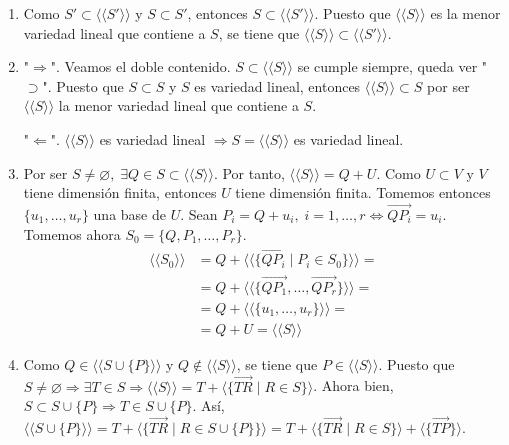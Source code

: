 \documentclass[12pt, a4paper, ones, notitlepage, openany,titlepage]{article}
\begin{document}
\begin{enumerate}[label=(\alph*)]
	\item Como $S' \subset \langle\langle S' \rangle\rangle$ y $S \subset S'$, entonces $S \subset \langle\langle S' \rangle\rangle$. Puesto que $\langle\langle S \rangle\rangle$ es la menor variedad lineal que contiene a $S$, se tiene que $\langle\langle S \rangle\rangle \subset \langle\langle S' \rangle\rangle$.
	\item "$\Longrightarrow$". Veamos el doble contenido. $S \subset \langle\langle S \rangle\rangle$ se cumple siempre, queda ver "$\supset$". Puesto que $S \subset S$ y $S$ es variedad lineal, entonces $\langle\langle S \rangle\rangle \subset S$ por ser $\langle\langle S \rangle\rangle$ la menor variedad lineal que contiene a $S$.
	
	"$\Longleftarrow$". $\langle\langle S \rangle\rangle$ es variedad lineal $\Longrightarrow S = \langle\langle S \rangle\rangle$ es variedad lineal.
	\item Por ser $S \neq \varnothing, \; \exists Q \in S \subset \langle\langle S \rangle\rangle$. Por tanto, $\langle\langle S \rangle\rangle = Q + U$. Como $U \subset V$ y $V$ tiene dimensión finita, entonces $U$ tiene dimensión finita. Tomemos entonces $\{u_1,\ldots,u_r\}$ una base de $U$. Sean $P_i = Q + u_i, \; i = 1,\ldots,r \Longleftrightarrow \overrightarrow{QP_i} = u_i$. Tomemos ahora $S_0 = \{Q, P_1, \ldots, P_r\}$.
	$$
	\begin{aligned}
		\langle\langle S_0 \rangle\rangle & = Q + \langle\langle \{\overrightarrow{QP_i} \mid P_i \in S_0\} \rangle\rangle = \\ & = Q + \langle\langle \{\overrightarrow{QP_1},\ldots,\overrightarrow{QP_r}\} \rangle\rangle = \\ & = Q + \langle\langle \{u_1,\ldots,u_r\} \rangle\rangle = \\ & = Q + U = \langle\langle S \rangle\rangle
	\end{aligned}
	$$
	\item Como $Q \in \langle\langle S \cup \{P\} \rangle\rangle$ y $Q \notin \langle\langle S \rangle\rangle$, se tiene que $P \in \langle\langle S \rangle\rangle$. Puesto que $S \neq \varnothing \Longrightarrow \exists T \in S \Longrightarrow \langle\langle S \rangle\rangle = T + \langle \{\overrightarrow{TR} \mid R \in S\} \rangle$. Ahora bien, $S \subset S \cup \{P\} \Longrightarrow T \in S \cup \{P\}$. Así, $\langle\langle S \cup \{P\} \rangle\rangle = T + \langle \{\overrightarrow{TR} \mid R \in S \cup \{P\}\} \rangle = T + \langle \{\overrightarrow{TR} \mid R \in S\} \rangle + \langle \{\overrightarrow{TP}\} \rangle$.
	

\end{enumerate}
\end{document}
